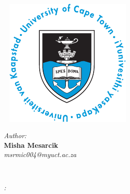 
%

\mode* %



%
\begin{frame}
~
\titlepage

\begin{center}

~
\includegraphics[scale = 0.9]{img/logo}
\vspace{0.5em} \\
\begin{minipage}{0.45\textwidth}
	\begin{flushleft} \large
		\emph{\tiny Author:}\\
		\textbf{Misha Mesarcik}\\
		\textit{\small msrmic004@myuct.ac.za}
		
	\end{flushleft}
\end{minipage}
~
\begin{minipage}{0.45\textwidth}
	\begin{flushright} \large
		\emph{\tiny :} \\
		\textbf{} \\
		\textit{\small }
	\end{flushright}
\end{minipage}\\[2cm]
\end{center}	
\end{frame}







